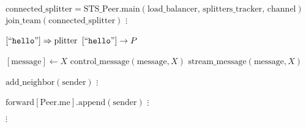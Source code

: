 \documentclass{article}
\begin{document}
\pagestyle{empty}

\newcommand{\send}{\Rightarrow}
\newcommand{\sendto}{\rightarrow}
\algrenewcommand\textproc{\textrm}

\begin{algorithmic}
  \algrenewcommand{}
  
  \State $\text{connected\_splitter}=\text{STS\_Peer.main}(\text{load\_balancer, splitters\_tracker, channel})$
  \State $\text{join\_team}(\text{connected\_splitter})$
  \State $\vdots$
  \EndFunction
  
  \State $[``\mathtt{hello}"] \send \text{plitter}$
  \State $[``\mathtt{hello}"] \sendto P$
  \EndFor
  \EndFunction

  \State $[\text{message}] \gets X$
  \State \Return $\text{control\_message}(\text{message}, X)$
  \Else
  \State \Return $\text{stream\_message}(\text{message}, X)$
  \EndIf
  \EndFunction
  
  \State $\text{add\_neighbor}(\text{sender})$
  \EndIf
  \State $\vdots$
  \EndFunction

  \State $\text{forward}[\text{Peer.me}].\text{append}(\text{sender})$
  \State $\vdots$
  \EndFunction

  $\vdots$

  \EndProcedure
\end{algorithmic}
\end{document}
